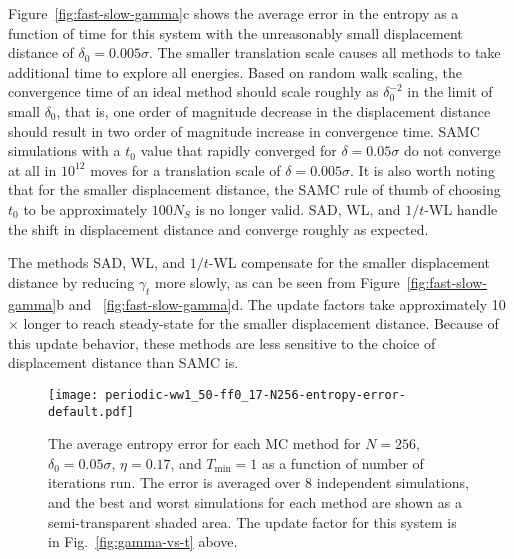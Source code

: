 \documentclass[letterpaper,twocolumn,amsmath,amssymb,pre,aps,10pt]{revtex4-1}
\begin{document}
Figure~\ref{fig:fast-slow-gamma}c shows the average error in
the entropy as a function of time for this system with the
unreasonably small displacement distance of $\delta_0 = 0.005\sigma$.
%
The smaller translation scale causes all methods to take additional time to
explore all energies. Based on random walk scaling, the convergence time of an
ideal method should scale roughly as $\delta_0^{-2}$ in the limit of small
$\delta_0$, that is, one order of magnitude decrease in the displacement
distance should result in two order of magnitude increase in convergence time.
SAMC simulations with a $t_0$ value that rapidly converged for $\delta =
0.05\sigma$ do not converge at all in $10^{12}$ moves for a translation scale of
$\delta = 0.005\sigma$. It is also worth noting that for the smaller
displacement distance, the SAMC rule of thumb of choosing $t_0$ to be
approximately $100N_S$ is no longer valid. SAD, WL, and $1/t$-WL handle the
shift in displacement distance and converge roughly as expected.

The methods SAD, WL, and $1/t$-WL compensate for the smaller
displacement distance by reducing $\gamma_t$ more slowly, as can be seen from
Figure~\ref{fig:fast-slow-gamma}b and ~\ref{fig:fast-slow-gamma}d.
The update factors take approximately 10$\times$ longer to reach steady-state
for the smaller displacement distance. Because of this update behavior,
these methods are less sensitive to the choice of displacement
distance than SAMC is.

%

\begin{figure}
\texttt{[image: periodic-ww1\_50-ff0\_17-N256-entropy-error-default.pdf]}
  \caption{
  The average entropy error for each MC method for $N=256$,
               $\delta_0 = 0.05\sigma$, $\eta = 0.17$, and $T_{\min} = 1$
               as a function of number of iterations run.  The error is
               averaged over 8 independent simulations, and the best
               and worst simulations for each method are shown as a
               semi-transparent shaded area.  The update factor for this
               system is in Fig.~\ref{fig:gamma-vs-t} above.}\label{fig:n256}
\end{figure}
\end{document}

